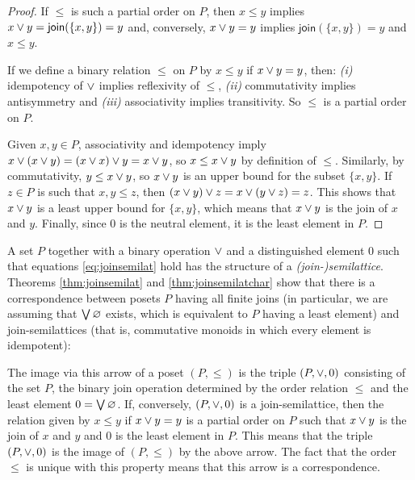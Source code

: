 \begin{proof}
	If $\leq$ is such a partial order on $P$, then $x\leq y$ implies
	$x\vee y=\mathsf{join}(\{x,y\})=y$ and, conversely,
	$x\vee y=y$ implies $\mathsf{join}(\{x,y\})=y$ and $x\leq y$.

	If we define a binary relation $\leq$ on $P$ by
	$x\leq y$ if $x\vee y=y$, then: \textit{(i)} idempotency of
	$\vee$ implies reflexivity of $\leq$, \textit{(ii)}
	commutativity implies antisymmetry and \textit{(iii)} associativity
	implies transitivity. So $\leq$ is a partial order on $P$.

	Given $x,y\in P$, associativity and idempotency imply
	$x\vee(x\vee y)=(x\vee x)\vee y=x\vee y$, so
	$x\leq x\vee y$ by definition of $\leq$. Similarly, by
	commutativity, $y\leq x\vee y$, so $x\vee y$ is an upper bound
	for the subset $\{x,y\}$. If $z\in P$ is such that $x,y\leq z$, then
	$(x\vee y)\vee z=x\vee(y\vee z)=z$. This shows that
	$x\vee y$ is a least upper bound for $\{x,y\}$, which means that
	$x\vee y$ is the join of $x$ and $y$. Finally, since $0$ is the
	neutral element, it is the least element in $P$.
\end{proof}

A set $P$ together with a binary operation $\vee$ and a distinguished
element $0$ such that equations \eqref{eq:joinsemilat} hold has the structure
of a \emph{(join-)semilattice}. Theorems \ref{thm:joinsemilat} and
\ref{thm:joinsemilatchar} show that there is a correspondence between posets
$P$ having all finite joins (in particular, we are assuming that
$\bigvee\varnothing$ exists, which is equivalent to $P$ having a least
element) and join-semilattices (that is, commutative monoids in which every
element is idempotent):
\begin{center}
\end{center}
%
The image via this arrow of a poset $(P,\leq)$ is the triple $(P,\vee,0)$
consisting of the set $P$, the binary join operation determined by the
order relation $\leq$ and the least element $0=\bigvee\varnothing$.
If, conversely, $(P,\vee,0)$ is a join-semilattice, then the relation
given by $x\leq y$ if $x\vee y=y$ is a partial order on $P$ such that
$x\vee y$ is the join of $x$ and $y$ and $0$ is the least element in $P$.
This means that the triple $(P,\vee,0)$ is the image of $(P,\leq)$ by
the above arrow. The fact that the order $\leq$ is unique with this property
means that this arrow is a correspondence.

